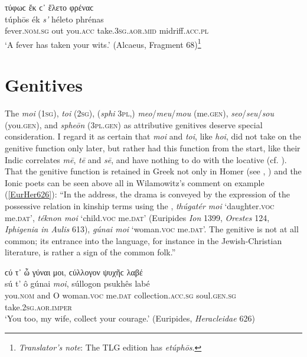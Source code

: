 \begin{exe}
\ex τύφωϲ ἔκ ϲ᾽ ἕλετο φρέναϲ\\
\gll túphōs ék \emph{s'} héleto phrénas\\
fever.\textsc{nom.sg} out you.\textsc{acc} take.\textsc{3sg.aor.mid}
midriff.\textsc{acc.pl}\\
\trans `A fever has taken your wits.' (Alcaeus, Fragment 68)\footnote{\emph{Translator's note}: The TLG edition \citep{LobelPage1968} has \textit{etúphōs}.}
\label{tmesis32}
\end{exe}


\section{Genitives}\label{genitives}

The  \textit{moi} (\textsc{1sg}), \textit{toi} (\textsc{2sg}), (\textit{sphi} \textsc{3pl},) \textit{meo}/\textit{meu}/\textit{mou} (me.\textsc{gen}), \textit{seo}/\textit{seu}/\textit{sou} (you.\textsc{gen}), and \textit{spheōn} (\textsc{3pl.gen}) as attributive genitives deserve special consideration. I regard it as certain that \textit{moi} and \textit{toi}, like \textit{hoi}, did not take on the genitive function only later, but rather had this function from the start, like their Indic correlates \emph{mē}, \emph{tē} and \emph{sē}, and have nothing to do with the locative (cf. \citealp[205]{Delbrueck1888}). That the genitive function is retained in Greek not only in Homer (see \citealp[819]{Brugmann1890}, \citealp[39]{Wackernagel1891}) and the Ionic poets can be seen above all in Wilamowitz's \citeyearpar[167]{Wilamowitz1889} comment\label{wilamowitz} on example (\ref{EurHer626}): ``In the address, the drama is conveyed by the expression of the possessive relation in kinship terms using the , \textit{thúgatér moi} `daughter.\textsc{voc} me.\textsc{dat}', \textit{téknon moi} `child.\textsc{voc} me.\textsc{dat}' (Euripides \textit{Ion} 1399, \textit{Orestes} 124, \textit{Iphigenia in Aulis} 613), \textit{gúnai moi} `woman.\textsc{voc} me.\textsc{dat}'. The genitive is not at all common; its entrance into the language, for instance in the Jewish-Christian literature, is rather a sign of the common folk.''

\begin{exe}
\ex ϲύ τ᾽ ὦ γύναι μοι, ϲύλλογον ψυχῆϲ λαβέ\\
\gll sú t' ô gúnai \emph{moi}, súllogon psukhês labé\\
you.\textsc{nom} and O woman.\textsc{voc} me.\textsc{dat}
collection.\textsc{acc.sg} soul.\textsc{gen.sg} take.\textsc{2sg.aor.imper}\\
\trans `You too, my wife, collect your courage.' (Euripides, \textit{Heracleidae} 626)
\label{EurHer626}
\end{exe}

